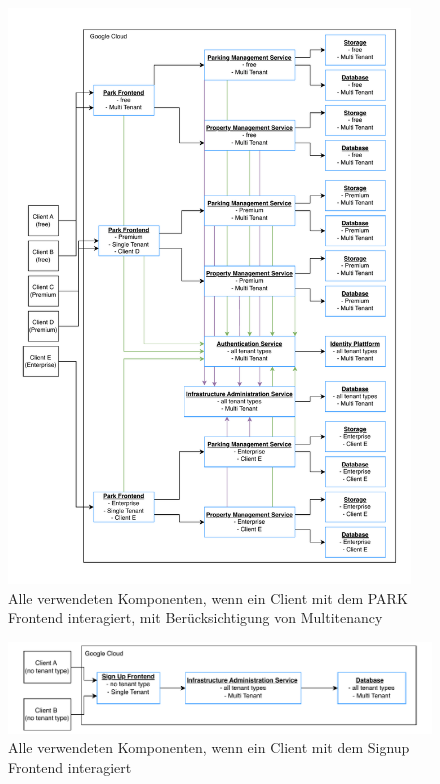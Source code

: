\begin{figure}[H]
	\centering
	\includegraphics[width=0.95\textwidth]{resources/03-runtime-view/pdf/components-frontend-park.pdf}
	\caption{Alle verwendeten Komponenten, wenn ein Client mit dem PARK Frontend interagiert, mit Berücksichtigung von Multitenancy}
	\label{fig:components-park-frontend}
\end{figure}

\begin{figure}[H]
	\centering
	\includegraphics[width=\textwidth]{resources/03-runtime-view/pdf/components-frontend-signup.pdf}
	\caption{Alle verwendeten Komponenten, wenn ein Client mit dem Signup Frontend interagiert}
	\label{fig:components-signup-frontend}
\end{figure}

